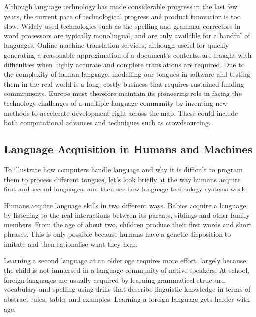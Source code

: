 \begin{multicols}{2}
 Although language technology has made considerable progress in the last few years, the current pace of technological progress and product innovation is too slow. 
Widely-used technologies such as the spelling and grammar correctors in word processors are typically monolingual, and are only available for a handful of languages. Online machine translation services, although useful for quickly generating a reasonable approximation of a document’s contents, are fraught with difficulties when highly accurate and complete translations are required. Due to the complexity of human language, modelling our tongues in software and testing them in the real world is a long, costly business that requires sustained funding commitments. Europe must therefore maintain its pioneering role in facing the technology challenges of a multiple-language community by inventing new methods to accelerate development right across the map. These could include both computational advances and techniques such as crowdsourcing.


\subsection{Language Acquisition in Humans and Machines}

    To illustrate how computers handle language and why it is difficult to program them to process different tongues, let’s look briefly at the way humans acquire first and second languages, and then see how language technology systems work. 

    Humans acquire language skills in two different ways. Babies acquire a language by listening to the real interactions between its parents, siblings and other family members. From the age of about two, children produce their first words and short phrases. This is only possible because humans have a genetic disposition to imitate and then rationalise what they hear. 

    Learning a second language at an older age requires more effort, largely because the child is not immersed in a language community of native speakers. At school, foreign languages are usually acquired by learning grammatical structure, vocabulary and spelling using drills that describe linguistic knowledge in terms of abstract rules, tables and examples. Learning a foreign language gets harder with age.


\end{multicols}
